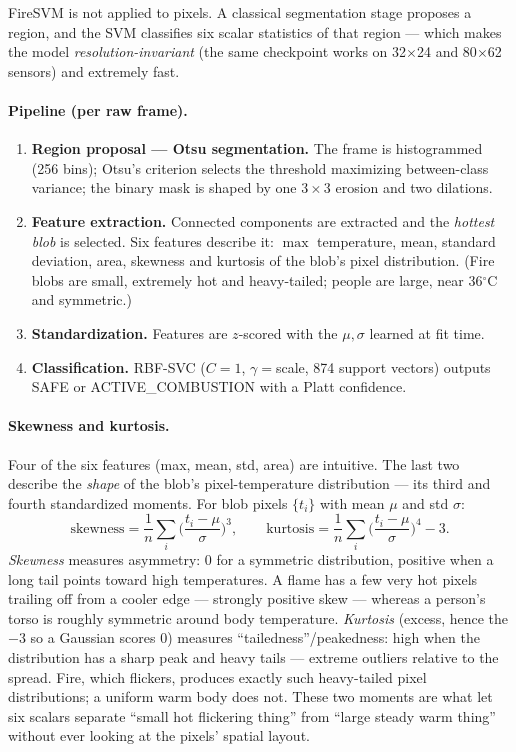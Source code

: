 \documentclass[11pt]{article}
\begin{document}
FireSVM is not applied to pixels. A classical segmentation stage proposes a
region, and the SVM classifies six scalar statistics of that region --- which
makes the model \emph{resolution-invariant} (the same checkpoint works on
32$\times$24 and 80$\times$62 sensors) and extremely fast.

\paragraph{Pipeline (per raw frame).}
\begin{enumerate}
\item \textbf{Region proposal --- Otsu segmentation.} The frame is
      histogrammed (256 bins); Otsu's criterion selects the threshold
      maximizing between-class variance; the binary mask is shaped by one
      $3{\times}3$ erosion and two dilations.
\item \textbf{Feature extraction.} Connected components are extracted and
      the \emph{hottest blob} is selected. Six features describe it:
      $\max$ temperature, mean, standard deviation, area, skewness and
      kurtosis of the blob's pixel distribution. (Fire blobs are small,
      extremely hot and heavy-tailed; people are large, near 36$^\circ$C
      and symmetric.)
\item \textbf{Standardization.} Features are $z$-scored with the
      $\mu,\sigma$ learned at fit time.
\item \textbf{Classification.} RBF-SVC ($C{=}1$, $\gamma{=}$scale, 874
      support vectors) outputs SAFE or ACTIVE\_COM\-BUS\-TION with a
      Platt confidence.
\end{enumerate}

\paragraph{Skewness and kurtosis.}
Four of the six features (max, mean, std, area) are intuitive. The last two
describe the \emph{shape} of the blob's pixel-temperature distribution ---
its third and fourth standardized moments. For blob pixels
$\{t_i\}$ with mean $\mu$ and std $\sigma$:
\[
\text{skewness}=\frac{1}{n}\sum_i\!\Big(\frac{t_i-\mu}{\sigma}\Big)^{\!3},
\qquad
\text{kurtosis}=\frac{1}{n}\sum_i\!\Big(\frac{t_i-\mu}{\sigma}\Big)^{\!4}-3 .
\]
\emph{Skewness} measures asymmetry: 0 for a symmetric distribution,
positive when a long tail points toward high temperatures. A flame has a
few very hot pixels trailing off from a cooler edge --- strongly positive
skew --- whereas a person's torso is roughly symmetric around body
temperature. \emph{Kurtosis} (excess, hence the $-3$ so a Gaussian scores
0) measures ``tailedness''/peakedness: high when the distribution has a
sharp peak and heavy tails --- extreme outliers relative to the spread.
Fire, which flickers, produces exactly such heavy-tailed pixel
distributions; a uniform warm body does not. These two moments are what let
six scalars separate ``small hot flickering thing'' from ``large steady
warm thing'' without ever looking at the pixels' spatial layout.
\end{document}

